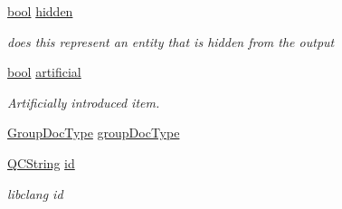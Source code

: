 \begin{DoxyCompactItemize}
\hyperlink{qglobal_8h_a1062901a7428fdd9c7f180f5e01ea056}{bool} \hyperlink{class_entry_acc4d59ae7ae3e94c3365ab8027593727}{hidden}
\begin{DoxyCompactList}\small\item\em does this represent an entity that is hidden from the output \end{DoxyCompactList}\item 
\hyperlink{qglobal_8h_a1062901a7428fdd9c7f180f5e01ea056}{bool} \hyperlink{class_entry_acbe763144d791b44aa3620b012d0dd30}{artificial}
\begin{DoxyCompactList}\small\item\em Artificially introduced item. \end{DoxyCompactList}\item 
\hyperlink{class_entry_a470b655d0d6179559a11a81e6617d509}{Group\+Doc\+Type} \hyperlink{class_entry_a158710fdea38498193fe93713a280717}{group\+Doc\+Type}
\item 
\hyperlink{class_q_c_string}{Q\+C\+String} \hyperlink{class_entry_a338fb12273a1a4f5dc124a1faf47d473}{id}
\begin{DoxyCompactList}\small\item\em libclang id \end{DoxyCompactList}\end{DoxyCompactItemize}
